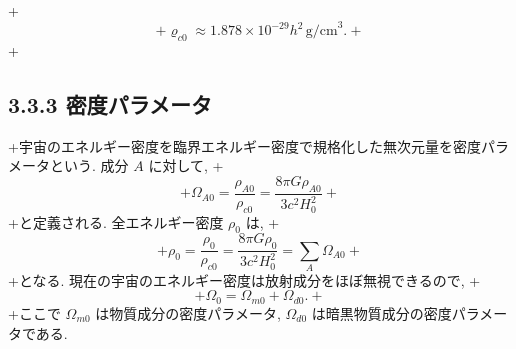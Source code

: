 \documentclass[a4paper,12pt]{article}
\begin{document}
+\begin{equation*}
+    \varrho_{c0} \approx 1.878 \times 10^{-29} h^2\, \text{g/cm}^3. \tag{3.59}
+\end{equation*}
+\subsection*{3.3.3 密度パラメータ}
+宇宙のエネルギー密度を臨界エネルギー密度で規格化した無次元量を密度パラメータという. 成分 $A$ に対して,
+\begin{equation*}
+    \Omega_{A0} = \frac{\rho_{A0}}{\rho_{c0}} = \frac{8\pi G\rho_{A0}}{3c^2 H_0^2} \tag{3.60}
+\end{equation*}
+と定義される. 全エネルギー密度 $\rho_{0}$ は,
+\begin{equation*}
+    \rho_{0} = \frac{\rho_{0}}{\rho_{c0}} = \frac{8\pi G\rho_{0}}{3c^2 H_0^2} = \sum_{A} \Omega_{A0} \tag{3.61}
+\end{equation*}
+となる. 現在の宇宙のエネルギー密度は放射成分をほぼ無視できるので,
+\begin{equation*}
+    \Omega_0 = \Omega_{m0} +  \Omega_{d0}. \tag{3.62}
+\end{equation*}
+ここで $\Omega_{m0}$ は物質成分の密度パラメータ, $\Omega_{d0}$ は暗黒物質成分の密度パラメータである. 
\end{document}
